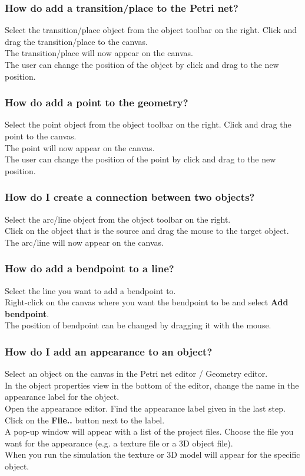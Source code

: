 \subsubsection{How do add a transition/place to the Petri net?}
Select the transition/place object from the object toolbar on the right. Click and drag the transition/place to the canvas. \\
The transition/place will now appear on the canvas. \\
The user can change the position of the object by click and drag to the new position.

\subsubsection{How do add a point to the geometry?}
Select the point object from the object toolbar on the right. Click and drag the point to the canvas. \\
The point will now appear on the canvas. \\
The user can change the position of the point by click and drag to the new position.

\subsubsection{How do I create a connection between two objects?}
Select the arc/line object from the object toolbar on the right.  \\
Click on the object that is the source and drag the mouse to the target object. \\
The arc/line will now appear on the canvas. 

\subsubsection{How do add a bendpoint to a line?}
Select the line you want to add a bendpoint to. \\
Right-click on the canvas where you want the bendpoint to be and select \textbf{Add bendpoint}. \\
The position of bendpoint can be changed by dragging it with the mouse.

\subsubsection{How do I add an appearance to an object?}
Select an object on the canvas in the Petri net editor / Geometry editor. \\
In the object properties view in the bottom of the editor, change the name in the appearance label for the object. \\
Open the appearance editor. Find the appearance label given in the last step. \\
Click on the \textbf{File..} button next to the label. \\
A pop-up window will appear with a list of the project files. Choose the file you want for the appearance (e.g. a texture file or a 3D object file).\\
When you run the simulation the texture or 3D model will appear for the specific object. 

